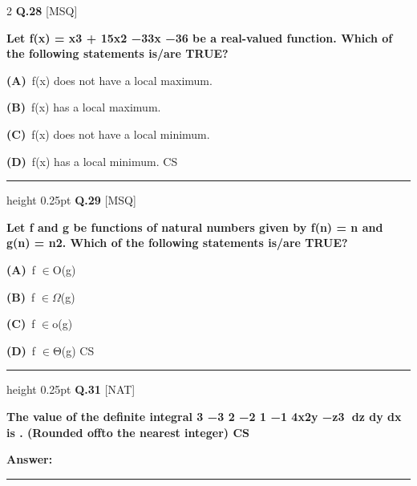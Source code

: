 \documentclass[a4paper,10pt,twoside]{article}
\begin{document}
\begin{multicols}{2}
\noindent\textbf{Q.28} \hfill {\footnotesize\textsf{[MSQ]}}
\par\vspace{2pt}
{\bfseries Let
f(x) = x3 + 15x2 −33x −36
be a real-valued function.
Which of the following statements is/are TRUE? \par}
\par\vspace{2pt}\noindent
\textbf{(A)}~f(x) does not have a local maximum.\par\vspace{2pt}\noindent
\textbf{(B)}~f(x) has a local maximum.\par\vspace{2pt}\noindent
\textbf{(C)}~f(x) does not have a local minimum.\par\vspace{2pt}\noindent
\textbf{(D)}~f(x) has a local minimum. \newline CS
\par\vspace{6pt}\hrule height 0.25pt\vspace{6pt}
\noindent\textbf{Q.29} \hfill {\footnotesize\textsf{[MSQ]}}
\par\vspace{2pt}
{\bfseries Let f and g be functions of natural numbers given by f(n) = n and g(n) = n2.
Which of the following statements is/are TRUE? \par}
\par\vspace{2pt}\noindent
\textbf{(A)}~f $\in$O(g)\par\vspace{2pt}\noindent
\textbf{(B)}~f $\in$$\Omega$(g)\par\vspace{2pt}\noindent
\textbf{(C)}~f $\in$o(g)\par\vspace{2pt}\noindent
\textbf{(D)}~f $\in$Θ(g) \newline CS
\par\vspace{6pt}\hrule height 0.25pt\vspace{6pt}
\noindent\textbf{Q.31} \hfill {\footnotesize\textsf{[NAT]}}
\par\vspace{2pt}
{\bfseries The value of the deﬁnite integral
3
−3
2
−2
1
−1
4x2y −z3
dz dy dx
is
. (Rounded oﬀto the nearest integer)
CS \par}
\par\vspace{3pt}\noindent\textbf{Answer:} \rule{3.2cm}{0.4pt}
$$
\end{multicols}
\end{document}

